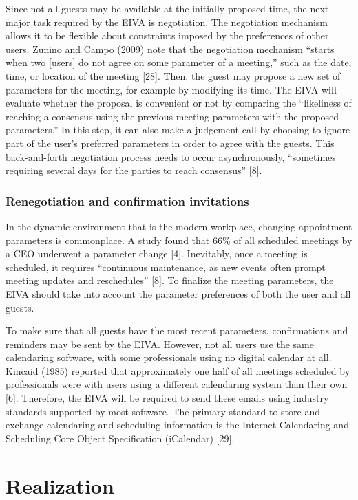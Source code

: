 \documentclass{article}
\begin{document}
Since not all guests may be available at the initially proposed time, the next major task required by the EIVA is negotiation. The negotiation mechanism allows it to be flexible about constraints imposed by the preferences of other users. Zunino and Campo (2009) note that the negotiation mechanism “starts when two [users] do not agree on some parameter of a meeting,” such as the date, time, or location of the meeting [28]. Then, the guest may propose a new set of parameters for the meeting, for example by modifying its time. The EIVA will evaluate whether the proposal is convenient or not by comparing the “likeliness of reaching a consensus using the previous meeting parameters with the proposed parameters.” In this step, it can also make a judgement call by choosing to ignore part of the user’s preferred parameters in order to agree with the guests. This back-and-forth negotiation process needs to occur asynchronously, “sometimes requiring several days for the parties to reach consensus” [8].

\subsubsection{Renegotiation and confirmation invitations}

In the dynamic environment that is the modern workplace, changing appointment parameters is commonplace. A study found that 66\% of all scheduled meetings by a CEO underwent a parameter change [4]. Inevitably, once a meeting is scheduled, it requires “continuous maintenance, as new events often prompt meeting updates and reschedules” [8]. To finalize the meeting parameters, the EIVA should take into account the parameter preferences of both the user and all guests.

To make sure that all guests have the most recent parameters, confirmations and reminders may be sent by the EIVA. However, not all users use the same calendaring software, with some professionals using no digital calendar at all. Kincaid (1985) reported that approximately one half of all meetings scheduled by professionals were with users using a different calendaring system than their own [6]. Therefore, the EIVA will be required to send these emails using industry standards supported by most software. The primary standard to store and exchange calendaring and scheduling information is the Internet Calendaring and Scheduling Core Object Specification (iCalendar) [29].

\newpage

\section{Realization}
\end{document}
